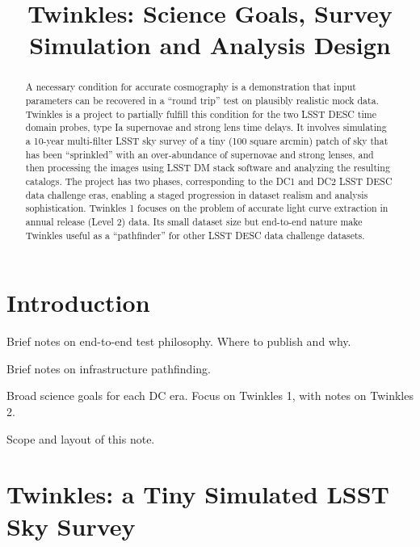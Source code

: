 \documentclass[\docopts]{\docclass}
\begin{document}
\title{ Twinkles: Science Goals, Survey Simulation and Analysis Design }

\maketitlepre

\begin{abstract}

A necessary condition for accurate cosmography is a demonstration that input parameters can be recovered in a ``round trip'' test on plausibly realistic mock data.
Twinkles is a project to partially fulfill this condition for the two LSST DESC time domain probes, type Ia supernovae and strong lens time delays.
It involves simulating a 10-year multi-filter LSST sky survey of a tiny (100 square arcmin) patch of sky that has been ``sprinkled'' with an over-abundance of supernovae and strong lenses, and then processing the images using LSST DM stack software and analyzing the resulting catalogs.
The project has two phases, corresponding to the DC1 and DC2 LSST DESC data challenge eras, enabling a staged progression in dataset realism and analysis sophistication.
Twinkles 1 focuses on the problem of accurate light curve extraction in annual release (Level 2) data.
Its small dataset size but end-to-end nature make Twinkles useful as a ``pathfinder'' for other LSST DESC data challenge datasets.

\end{abstract}


\maketitlepost

%

\section{Introduction}
\label{sec:intro}

Brief notes on end-to-end test philosophy. Where to publish and why.

Brief notes on infrastructure pathfinding.

Broad science goals for each DC era. Focus on Twinkles 1, with notes on Twinkles 2.

Scope and layout of this note.



\section{Twinkles: a Tiny Simulated LSST Sky Survey}
\label{sec:concepts}
\end{document}
